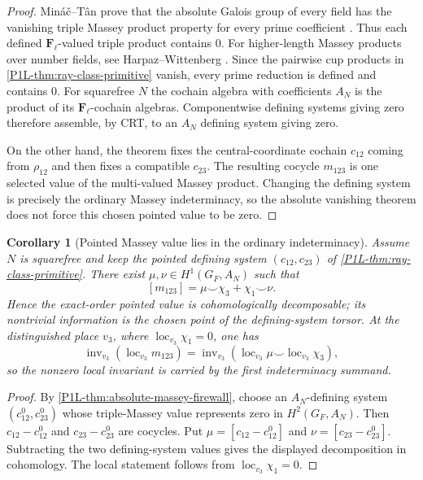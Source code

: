 \documentclass[11pt]{article}
\newtheorem{corollary}[theorem]{Corollary}
\theoremstyle{remark}
\newcommand{\F}{\mathbf F}
\providecommand{\loc}{\operatorname{loc}}
\providecommand{\inv}{\operatorname{inv}}
\begin{document}
\begin{proof}
Min\'a\v{c}--T\^an prove that the absolute Galois group of every field has
the vanishing triple Massey product property for every prime coefficient
\cite{MinacTan}.  Thus each defined \(\F_\ell\)-valued triple product contains
\(0\).  For higher-length Massey products over number fields, see
Harpaz--Wittenberg \cite{HarpazWittenberg}.  Since the pairwise cup products in
\cref{P1L-thm:ray-class-primitive} vanish, every prime reduction is defined and
contains $0$.  For squarefree $N$ the cochain algebra with coefficients
$A_N$ is the product of its $\F_\ell$-cochain algebras.  Componentwise
defining systems giving zero therefore assemble, by CRT, to an $A_N$ defining
system giving zero.

On the other hand, the theorem fixes the central-coordinate cochain
$c_{12}$ coming from $\rho_{12}$ and then fixes a compatible $c_{23}$.
The resulting cocycle $m_{123}$ is one selected value of the multi-valued
Massey product.  Changing the defining system is precisely the ordinary
Massey indeterminacy, so the absolute vanishing theorem does not force this
chosen pointed value to be zero.
\end{proof}

\begin{corollary}[Pointed Massey value lies in the ordinary indeterminacy]
\label{P1L-cor:pointed-massey-decomposable}
Assume \(N\) is squarefree and keep the pointed defining system
\((c_{12},c_{23})\) of \cref{P1L-thm:ray-class-primitive}.  There exist
\(\mu,\nu\in H^1(G_F,A_N)\) such that
\[
 \boxed{
 [m_{123}]
 =\mu\smile\chi_3+\chi_1\smile\nu.}
\]
Hence the exact-order pointed value is cohomologically decomposable; its
nontrivial information is the chosen point of the defining-system torsor.
At the distinguished place \(v_3\), where
\(\loc_{v_3}\chi_1=0\), one has
\[
 \inv_{v_3}(\loc_{v_3}m_{123})
 =\inv_{v_3}(\loc_{v_3}\mu\smile\loc_{v_3}\chi_3),
\]
so the nonzero local invariant is carried by the first indeterminacy
summand.
\end{corollary}

\begin{proof}
By \cref{P1L-thm:absolute-massey-firewall}, choose an \(A_N\)-defining system
\((c_{12}^0,c_{23}^0)\) whose triple-Massey value represents zero in
\(H^2(G_F,A_N)\).  Then
\(c_{12}-c_{12}^0\) and \(c_{23}-c_{23}^0\) are cocycles.  Put
\(\mu=[c_{12}-c_{12}^0]\) and \(\nu=[c_{23}-c_{23}^0]\).  Subtracting the
two defining-system values gives the displayed decomposition in cohomology.
The local statement follows from \(\loc_{v_3}\chi_1=0\).
\end{proof}
\end{document}
